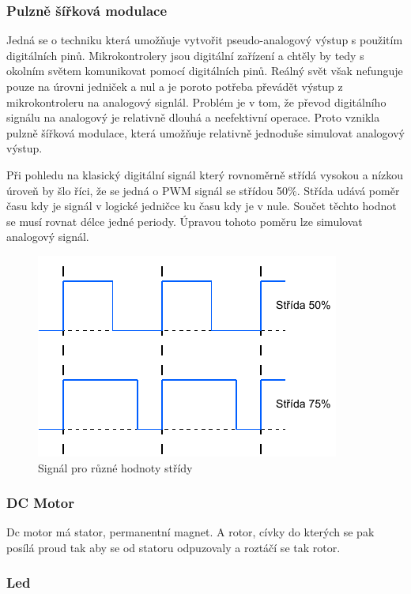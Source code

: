 \subsubsection*{Pulzně šířková modulace}
Jedná se o techniku která umožňuje vytvořit pseudo-analogový výstup s použitím digitálních pinů. Mikrokontrolery jsou digitální zařízení a chtěly by tedy s okolním světem komunikovat pomocí digitálních pinů. Reálný svět však nefunguje pouze na úrovni jedniček a nul a je poroto potřeba převádět výstup z mikrokontroleru na analogový signlál. Problém je v tom, že převod digitálního signálu na analogový je relativně dlouhá a neefektivní operace. Proto vznikla pulzně šířková modulace, která umožňuje relativně jednoduše simulovat analogový výstup.

Při pohledu na klasický digitální signál který rovnoměrně střídá vysokou a nízkou úroveň by šlo říci, že se jedná o PWM signál se střídou 50\%. Střída udává poměr času kdy je signál v logické jedničce ku času kdy je v nule. Součet těchto hodnot se musí rovnat délce jedné periody. Úpravou tohoto poměru lze simulovat analogový signál.

\begin{figure}[h!]
	\centering
	\includegraphics[scale=1]{obrazky-figures/pwm_duty_cycle.pdf}
	\caption{Signál pro různé hodnoty střídy}
	\label{}
\end{figure}

\subsubsection*{DC Motor}
Dc motor má stator, permanentní magnet. A rotor, cívky do kterých se pak posílá proud tak aby se od statoru odpuzovaly a roztáčí se tak rotor.

\subsubsection*{Led}

